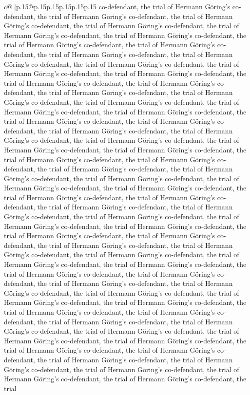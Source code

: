 \documentclass{article}
\begin{document}
{\begin{supertabular}{c@{$\;$}|p{.15\linewidth}@{}p{.15\linewidth}p{.15\linewidth}p{.15\linewidth}p{.15\linewidth}p{.15\linewidth}}
{{{co{-}defendant, the trial of Hermann Göring's co{-}defendant, the trial of Hermann Göring's co{-}defendant, the trial of Hermann Göring's co{-}defendant, the trial of Hermann Göring's co{-}defendant, the trial of Hermann Göring's co{-}defendant, the trial of Hermann Göring's co{-}defendant, the trial of Hermann Göring's co{-}defendant, the trial of Hermann Göring's co{-}defendant, the trial of Hermann Göring's co{-}defendant, the trial of Hermann Göring's co{-}defendant, the trial of Hermann Göring's co{-}defendant, the trial of Hermann Göring's co{-}defendant, the trial of Hermann Göring's co{-}defendant, the trial of Hermann Göring's co{-}defendant, the trial of Hermann Göring's co{-}defendant, the trial of Hermann Göring's co{-}defendant, the trial of Hermann Göring's co{-}defendant, the trial of Hermann Göring's co{-}defendant, the trial of Hermann Göring's co{-}defendant, the trial of Hermann Göring's co{-}defendant, the trial of Hermann Göring's co{-}defendant, the trial of Hermann Göring's co{-}defendant, the trial of Hermann Göring's co{-}defendant, the trial of Hermann Göring's co{-}defendant, the trial of Hermann Göring's co{-}defendant, the trial of Hermann Göring's co{-}defendant, the trial of Hermann Göring's co{-}defendant, the trial of Hermann Göring's co{-}defendant, the trial of Hermann Göring's co{-}defendant, the trial of Hermann Göring's co{-}defendant, the trial of Hermann Göring's co{-}defendant, the trial of Hermann Göring's co{-}defendant, the trial of Hermann Göring's co{-}defendant, the trial of Hermann Göring's co{-}defendant, the trial of Hermann Göring's co{-}defendant, the trial of Hermann Göring's co{-}defendant, the trial of Hermann Göring's co{-}defendant, the trial of Hermann Göring's co{-}defendant, the trial of Hermann Göring's co{-}defendant, the trial of Hermann Göring's co{-}defendant, the trial of Hermann Göring's co{-}defendant, the trial of Hermann Göring's co{-}defendant, the trial of Hermann Göring's co{-}defendant, the trial of Hermann Göring's co{-}defendant, the trial of Hermann Göring's co{-}defendant, the trial of Hermann Göring's co{-}defendant, the trial of Hermann Göring's co{-}defendant, the trial of Hermann Göring's co{-}defendant, the trial of Hermann Göring's co{-}defendant, the trial of Hermann Göring's co{-}defendant, the trial of Hermann Göring's co{-}defendant, the trial of Hermann Göring's co{-}defendant, the trial of Hermann Göring's co{-}defendant, the trial of Hermann Göring's co{-}defendant, the trial of Hermann Göring's co{-}defendant, the trial of Hermann Göring's co{-}defendant, the trial of Hermann Göring's co{-}defendant, the trial of Hermann Göring's co{-}defendant, the trial of Hermann Göring's co{-}defendant, the trial of Hermann Göring's co{-}defendant, the trial of Hermann Göring's co{-}defendant, the trial of Hermann Göring's co{-}defendant, the trial of Hermann Göring's co{-}defendant, the trial of Hermann Göring's co{-}defendant, the trial of Hermann Göring's co{-}defendant, the trial of Hermann Göring's co{-}defendant, the trial of Hermann Göring's co{-}defendant, the trial of Hermann Göring's co{-}defendant, the trial of Hermann Göring's co{-}defendant, the trial }}}
\end{supertabular}}
\end{document}
